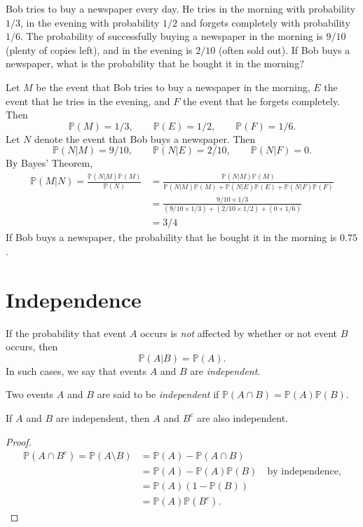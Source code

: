\documentclass[lecture]{csm}
\newcommand{\prob}{\mathbb{P}}
\begin{document}
\newpage %

\begin{exercise}
Bob tries to buy a newspaper every day. He tries in the morning with probability $1/3$, in the evening with probability $1/2$ and forgets completely with probability $1/6$. The probability of successfully buying a newspaper in the morning is $9/10$ (plenty of copies left), and in the evening is $2/10$ (often sold out). If Bob buys a newspaper, what is the probability that he bought it in the morning?
\end{exercise}

\begin{solution}
Let $M$ be the event that Bob tries to buy a newspaper in the morning, $E$ the event that he tries in the evening, and $F$ the event that he forgets completely. Then
\[
\prob(M) = 1/3, \qquad \prob(E) = 1/2, \qquad \prob(F) = 1/6.
\]
Let $N$ denote the event that Bob buys a newspaper. Then
\[
\prob(N|M) = 9/10, \qquad \prob(N|E) = 2/10, \qquad \prob(N|F) = 0.
\]
By Bayes' Theorem,
\begin{align*}
\prob(M|N) = \frac{\prob(N|M)\prob(M)}{\prob(N)}
	& = \frac{\prob(N|M)\prob(M)}{\prob(N|M)\prob(M) + \prob(N|E)\prob(E) + \prob(N|F)\prob(F)} \\
	& = \frac{9/10\times 1/3}{(9/10\times 1/3) + (2/10\times 1/2) + (0\times 1/6)} \\
	& = 3/4
\end{align*}
If Bob buys a newspaper, the probability that he bought it in the morning is $0.75$.
\end{solution}


\section{Independence}
If the probability that event $A$ occurs is \emph{not} affected by whether or not event $B$ occurs, then
\[
\prob(A|B) = \prob(A).
\]
In such cases, we say that events $A$ and $B$ are \emph{independent}.

\begin{definition}
Two events $A$ and $B$ are said to be \emph{independent} if $\prob(A\cap B) = \prob(A)\prob(B)$.
\end{definition}

\begin{lemma}
If $A$ and $B$ are independent, then $A$ and $B^c$ are also independent.
\end{lemma}
\begin{proof}
\[\begin{array}{ll}
\prob(A\cap B^c) 
	= \prob(A\setminus B)
	& = \prob(A) - \prob(A\cap B) \\
	& = \prob(A) - \prob(A)\prob(B) \quad\text{by independence,} \\
	& = \prob(A)(1-\prob(B)) \\
	& = \prob(A)\prob(B^c).
\end{array}\]
\end{proof}
\end{document}
